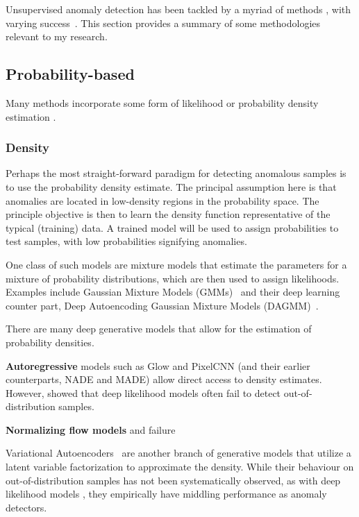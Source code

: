 Unsupervised anomaly detection has been tackled by a myriad of methods \cite{pang_deep_2021,ruff_unifying_2021}, with varying success~\cite{han2022adbench}. This section provides a summary of some methodologies relevant to my research.

\subsection{Probability-based}

Many methods incorporate some form of likelihood or probability density estimation . 

\subsubsection*{Density}
Perhaps the most straight-forward paradigm for detecting anomalous samples is to use the probability density estimate. The principal assumption here is that anomalies are located in low-density regions in the probability space. The principle objective is then to learn the density function representative of the typical (training) data. A trained model will be used to assign probabilities to test samples, with low probabilities signifying anomalies.


One class of such models are mixture models that estimate the parameters for a mixture of probability distributions, which are then used to assign likelihoods.
Examples include Gaussian Mixture Models (GMMs)~\cite{reynolds2009gaussian} and their deep learning counter part, Deep Autoencoding Gaussian Mixture Models (DAGMM)~\cite{zong2018deep}.

There are many deep generative models that allow for the estimation of probability densities. 

\textbf{Autoregressive} models such as Glow and PixelCNN (and their earlier counterparts, NADE and MADE) allow direct access to density estimates. However,  showed that deep likelihood models often fail to detect out-of-distribution samples.

\textbf{Normalizing flow models} and failure


Variational Autoencoders~\cite{kingma2013auto} are another branch of generative models that utilize a latent variable factorization to approximate the density. While their behaviour on out-of-distribution samples has not been systematically observed, as with deep likelihood models , they empirically have middling performance as anomaly detectors.


